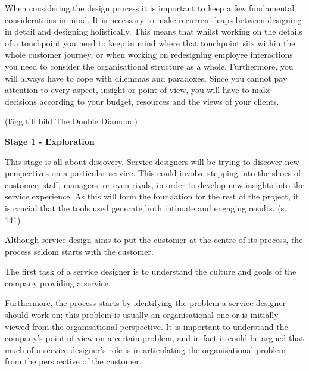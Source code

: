 When considering the design process it is important to keep a few fundamental considerations in mind. It is necessary to make recurrent leaps between designing in detail and designing holistically. This means that whilst working on the details of a touchpoint you need to keep in mind where that touchpoint sits within the whole customer journey, or when working on redesigning employee interactions you need to consider the organisational structure as a whole. Furthermore, you will always have to cope with dilemmas and paradoxes. Since you cannot pay attention to every aspect, insight or point of view, you will have to make decisions according to your budget, resources and the views of your clients.


(lägg till bild The Double Diamond)

\textbf{Stage 1 - Exploration}

This stage is all about discovery. Service designers will be trying to discover new perspectives on a particular service. This could involve stepping into the shoes of customer, staff, managers, or even rivals, in order to develop new insights into the service experience. As this will form the foundation for the rest of the project, it is crucial that the tools used generate both intimate and engaging results. (s. 141)

Although service design aims to put the customer at the centre of its process, the process seldom starts with the customer.

The first task of a service designer is to understand the culture and goals of the company providing a service.

Furthermore, the process starts by identifying the problem a service designer should work on; this problem is usually an organisational one or is initially viewed from the organisational perspective. It is important to understand the company’s point of view on a certain problem, and in fact it could be argued that much of a service designer’s role is in articulating the organisational problem from the perspective of the customer.

